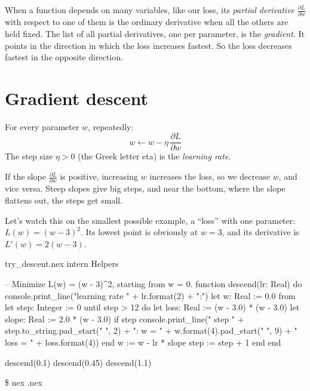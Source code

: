 \documentclass[11pt,a4paper,oneside,openany]{book}
\newcommand{\tryoutput}[1]{%
  \begin{tcolorbox}[outbox]
  {\ttfamily\footnotesize\color{outfg}\$ nex \detokenize{#1}.nex}\par\vspace{2pt}
  
  \end{tcolorbox}}
\newcommand{\pd}[2]{\frac{\partial #1}{\partial #2}}
\begin{document}
When a function depends on many variables, like our loss, its
\emph{partial derivative} $\pd{L}{w}$ with respect to one of them is the
ordinary derivative when all the others are held fixed. The list of all
partial derivatives, one per parameter, is the \emph{gradient}. It points
in the direction in which the loss increases fastest. So the loss
decreases fastest in the opposite direction.

\section{Gradient descent}

\begin{mathbox}
For every parameter $w$, repeatedly:
\[
  w \leftarrow w - \eta\,\pd{L}{w}
\]
The step size $\eta > 0$ (the Greek letter eta) is the \emph{learning rate}.
\end{mathbox}

If the slope $\pd{L}{w}$ is positive, increasing $w$ increases the loss,
so we decrease $w$, and vice versa. Steep slopes give big steps, and near
the bottom, where the slope flattens out, the steps get small.

Let's watch this on the smallest possible example, a ``loss'' with one
parameter: $L(w) = (w - 3)^2$. Its lowest point is obviously at $w = 3$,
and its derivative is $L'(w) = 2(w - 3)$.

\begin{tryit}{try_descent.nex}
intern Helpers

-- Minimize L(w) = (w - 3)^2, starting from w = 0.
function descend(lr: Real) do
  console.print_line("learning rate " + lr.format(2) + ":")
  let w: Real := 0.0
  from
    let step: Integer := 0
  until
    step > 12
  do
    let loss: Real := (w - 3.0) * (w - 3.0)
    let slope: Real := 2.0 * (w - 3.0)
    if step %
      console.print_line("  step " + step.to_string.pad_start(" ", 2) + ": w = "
        + w.format(4).pad_start(" ", 9) + "   loss = " + loss.format(4))
    end
    w := w - lr * slope
    step := step + 1
  end
end

descend(0.1)
descend(0.45)
descend(1.1)
\end{tryit}
\tryoutput{try_descent}

\begin{center}
\end{center}
\end{document}
